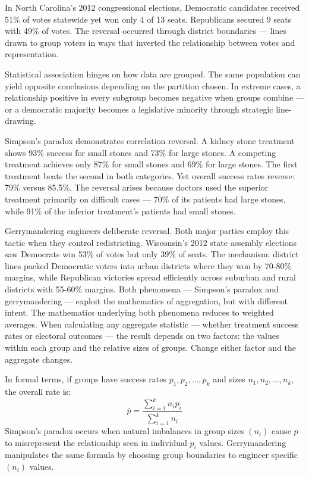 In North Carolina's 2012 congressional elections, Democratic candidates received 51\% of votes statewide yet won only 4 of 13 seats. Republicans secured 9 seats with 49\% of votes. The reversal occurred through district boundaries — lines drawn to group voters in ways that inverted the relationship between votes and representation.

Statistical association hinges on how data are grouped. The same population can yield opposite conclusions depending on the partition chosen. In extreme cases, a relationship positive in every subgroup becomes negative when groups combine — or a democratic majority becomes a legislative minority through strategic line-drawing.

Simpson's paradox demonstrates correlation reversal. A kidney stone treatment shows 93\% success for small stones and 73\% for large stones. A competing treatment achieves only 87\% for small stones and 69\% for large stones. The first treatment beats the second in both categories. Yet overall success rates reverse: 79\% versus 85.5\%. The reversal arises because doctors used the superior treatment primarily on difficult cases — 70\% of its patients had large stones, while 91\% of the inferior treatment's patients had small stones.

Gerrymandering engineers deliberate reversal. Both major parties employ this tactic when they control redistricting. Wisconsin's 2012 state assembly elections saw Democrats win 53\% of votes but only 39\% of seats. The mechanism: district lines packed Democratic voters into urban districts where they won by 70-80\% margins, while Republican victories spread efficiently across suburban and rural districts with 55-60\% margins. Both phenomena — Simpson's paradox and gerrymandering — exploit the mathematics of aggregation, but with different intent. The mathematics underlying both phenomena reduces to weighted averages. When calculating any aggregate statistic — whether treatment success rates or electoral outcomes — the result depends on two factors: the values within each group and the relative sizes of groups. Change either factor and the aggregate changes.

In formal terms, if groups have success rates $p_1, p_2, ..., p_k$ and sizes $n_1, n_2, ..., n_k$, the overall rate is:
\[
\bar{p} = \frac{\sum_{i=1}^k n_i p_i}{\sum_{i=1}^k n_i}
\]
Simpson's paradox occurs when natural imbalances in group sizes $(n_i)$ cause $\bar{p}$ to misrepresent the relationship seen in individual $p_i$ values. Gerrymandering manipulates the same formula by choosing group boundaries to engineer specific $(n_i)$ values.

